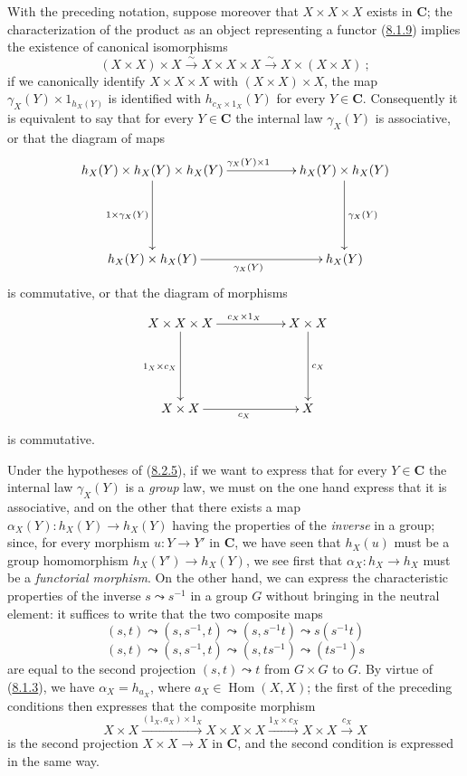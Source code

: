 \begin{env}[8.2.5]
\label{0.8.2.5}
With the preceding notation, suppose moreover that $X\times X\times X$
exists in $\boldsymbol{C}$; the characterization of the product as an object representing a
functor (\hyperref[0.8.1.9]{8.1.9}) implies the existence of canonical
isomorphisms
\[
  (X\times X)\times X\xrightarrow{\sim}X\times X\times X
  \xrightarrow{\sim}X\times(X\times X)~;
\]
if we canonically identify $X\times X\times X$ with $(X\times X)\times X$,
the map $\gamma_X(Y)\times 1_{h_X(Y)}$ is identified with
$h_{c_X\times 1_X}(Y)$ for every $Y\in \boldsymbol{C}$. Consequently it is equivalent to
say that for every $Y\in \boldsymbol{C}$ the internal law $\gamma_X(Y)$ is
associative, or that the diagram of maps
\[
  \xymatrix{
    h_X(Y)\times h_X(Y)\times h_X(Y)
      \ar[rr]^{\gamma_X(Y)\times 1}\ar[dd]_{1\times\gamma_X(Y)} &&
    h_X(Y)\times h_X(Y)\ar[dd]^{\gamma_X(Y)}\\\\
    h_X(Y)\times h_X(Y)\ar[rr]_{\gamma_X(Y)} && h_X(Y)
  }
\]
is commutative, or that the diagram of morphisms
\[
  \xymatrix{
    X\times X\times X
      \ar[rr]^{c_X\times 1_X}\ar[dd]_{1_X\times c_X} &&
    X\times X\ar[dd]^{c_X}\\\\
    X\times X\ar[rr]_{c_X} && X
  }
\]
is commutative.
\end{env}

\begin{env}[8.2.6]
\label{0.8.2.6}
Under the hypotheses of (\hyperref[0.8.2.5]{8.2.5}), if we want to express
that for every $Y\in \boldsymbol{C}$ the internal law $\gamma_X(Y)$ is a \emph{group}
law, we must on the one hand express that it is associative, and on the
other that there exists a map $\alpha_X(Y):h_X(Y)\to h_X(Y)$ having the
properties of the \emph{inverse} in a group; since, for every morphism
$u:Y\to Y'$ in $\boldsymbol{C}$, we have seen that $h_X(u)$ must be a group
homomorphism $h_X(Y')\to h_X(Y)$, we see first that $\alpha_X:h_X\to h_X$
must be a \emph{functorial morphism}. On the other hand, we can express the
characteristic properties of the inverse $s\leadsto s^{-1}$ in a group
$G$ without bringing in the neutral element: it suffices to write that the
two composite maps
\[
  (s,t)\leadsto(s,s^{-1},t)\leadsto(s,s^{-1}t)\leadsto s(s^{-1}t)
\]
\[
  (s,t)\leadsto(s,s^{-1},t)\leadsto(s,ts^{-1})\leadsto(ts^{-1})s
\]
are equal to the second projection $(s,t)\leadsto t$ from $G\times G$ to
$G$. By virtue of (\hyperref[0.8.1.3]{8.1.3}), we have
$\alpha_X=h_{a_X}$, where $a_X\in\operatorname{Hom}(X,X)$; the first
of the preceding conditions then expresses that the composite morphism
\[
  X\times X\xrightarrow{(1_X,a_X)\times 1_X}X\times X\times X
  \xrightarrow{1_X\times c_X}X\times X\xrightarrow{c_X}X
\]
is the second projection $X\times X\to X$ in $\boldsymbol{C}$, and the second condition
is expressed in the same way.
\end{env}

